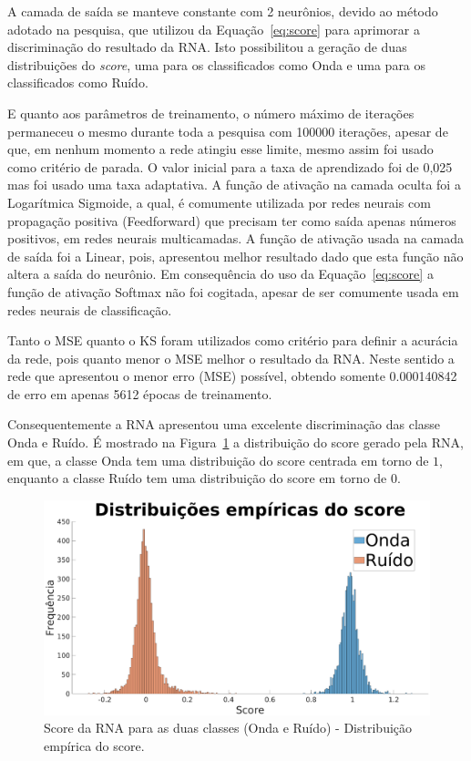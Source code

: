 A camada de saída se manteve constante com 2 neurônios, devido ao método adotado na pesquisa, que utilizou da Equação~\ref{eq:score} para aprimorar a discriminação do resultado da RNA. Isto possibilitou a geração de duas distribuições do \textit{score}, uma para os classificados como Onda e uma para os classificados como Ruído.

E quanto aos parâmetros de treinamento, o número máximo de iterações permaneceu o mesmo durante toda a pesquisa com 100000 iterações, apesar de que, em nenhum momento a rede atingiu esse limite, mesmo assim foi usado como critério de parada. O valor inicial para a taxa de aprendizado foi de 0,025 mas foi usado uma taxa adaptativa. A função de ativação na camada oculta foi a Logarítmica Sigmoide, a qual, é comumente utilizada por redes neurais com propagação positiva (Feedforward) que precisam ter como saída apenas números positivos, em redes neurais multicamadas. A função de ativação usada na camada de saída foi a Linear, pois, apresentou melhor resultado dado que esta função não altera a saída do neurônio. Em consequência do uso da Equação~\ref{eq:score}  a função de ativação Softmax não foi cogitada, apesar de ser comumente usada em redes neurais de classificação.

Tanto o MSE quanto o KS foram utilizados como critério para definir a acurácia da rede, pois quanto menor o MSE melhor o resultado da RNA. Neste sentido a rede que apresentou o menor erro (MSE) possível, obtendo somente 0.000140842 de erro em apenas 5612 épocas de treinamento.

Consequentemente a RNA apresentou uma excelente discriminação das classe Onda e Ruído. É mostrado na Figura~\ref{fig:histograma} a distribuição do score gerado pela RNA, em que, a classe Onda tem uma distribuição do score centrada em torno de $1$, enquanto a classe Ruído tem uma distribuição do score em torno de $0$. 

\begin{figure}[H]
\centering
\includegraphics[width=1\textwidth]{figuras/histograma.eps}
\caption{Score da RNA para as duas classes (Onda e Ruído) - Distribuição empírica do score.}
\label{fig:histograma}
\end{figure}

